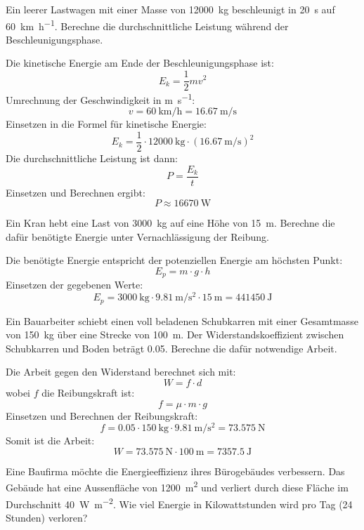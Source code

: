 \begin{questions}
\question
Ein leerer Lastwagen mit einer Masse von \SI{12000}{\kilo\gram} beschleunigt in \SI{20}{\second} auf \SI{60}{\kilo\meter\per\hour}. Berechne die durchschnittliche Leistung während der Beschleunigungsphase.

\begin{solution}
Die kinetische Energie am Ende der Beschleunigungsphase ist:
\[ E_k = \frac{1}{2} m v^2 \]
Umrechnung der Geschwindigkeit in \si{\meter\per\second}:
\[ v = \SI{60}{\kilo\meter\per\hour} = \SI{16.67}{\meter\per\second} \]
Einsetzen in die Formel für kinetische Energie:
\[ E_k = \frac{1}{2} \cdot \SI{12000}{\kilo\gram} \cdot (\SI{16.67}{\meter\per\second})^2 \]
Die durchschnittliche Leistung ist dann:
\[ P = \frac{E_k}{t} \]
Einsetzen und Berechnen ergibt:
\[ P \approx \SI{16670}{\watt} \]
\end{solution}

\question
Ein Kran hebt eine Last von \SI{3000}{\kilo\gram} auf eine Höhe von \SI{15}{\meter}. Berechne die dafür benötigte Energie unter Vernachlässigung der Reibung.

\begin{solution}
Die benötigte Energie entspricht der potenziellen Energie am höchsten Punkt:
\[ E_p = m \cdot g \cdot h \]
Einsetzen der gegebenen Werte:
\[ E_p = \SI{3000}{\kilo\gram} \cdot \SI{9.81}{\meter\per\second\squared} \cdot \SI{15}{\meter} = \SI{441450}{\joule} \]
\end{solution}

\question
Ein Bauarbeiter schiebt einen voll beladenen Schubkarren mit einer Gesamtmasse von \SI{150}{\kilo\gram} über eine Strecke von \SI{100}{\meter}. Der Widerstandskoeffizient zwischen Schubkarren und Boden beträgt 0.05. Berechne die dafür notwendige Arbeit.

\begin{solution}
Die Arbeit gegen den Widerstand berechnet sich mit:
\[ W = f \cdot d \]
wobei \( f \) die Reibungskraft ist:
\[ f = \mu \cdot m \cdot g \]
Einsetzen und Berechnen der Reibungskraft:
\[ f = 0.05 \cdot \SI{150}{\kilo\gram} \cdot \SI{9.81}{\meter\per\second\squared} = \SI{73.575}{\newton} \]
Somit ist die Arbeit:
\[ W = \SI{73.575}{\newton} \cdot \SI{100}{\meter} = \SI{7357.5}{\joule} \]
\end{solution}

\question
Eine Baufirma möchte die Energieeffizienz ihres Bürogebäudes verbessern. Das Gebäude hat eine Aussenfläche von \SI{1200}{\meter\squared} und verliert durch diese Fläche im Durchschnitt \SI{40}{\watt\per\meter\squared}. Wie viel Energie in Kilowattstunden wird pro Tag (24 Stunden) verloren?


\end{questions}
